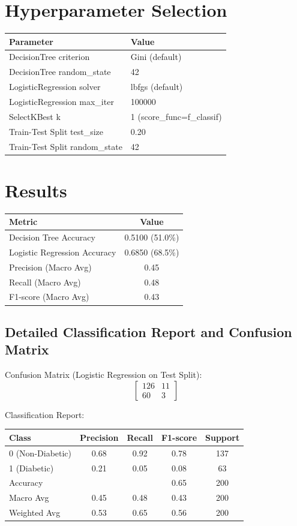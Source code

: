 \documentclass[12pt,a4paper]{article}
\begin{document}
\section{Hyperparameter Selection}

\begin{tabular}{ll}
\toprule
Parameter & Value\\
\midrule
DecisionTree criterion & Gini (default) \\
DecisionTree random\_state & 42 \\
LogisticRegression solver & lbfgs (default) \\
LogisticRegression max\_iter & 100000 \\
SelectKBest k & 1 (score\_func=f\_classif) \\
Train-Test Split test\_size & 0.20 \\
Train-Test Split random\_state & 42 \\
\bottomrule
\end{tabular}

\section{Results}

\begin{tabular}{lc}
\toprule
Metric & Value\\
\midrule
Decision Tree Accuracy & 0.5100 (51.0\%) \\
Logistic Regression Accuracy & 0.6850 (68.5\%) \\
Precision (Macro Avg) & 0.45 \\
Recall (Macro Avg) & 0.48 \\
F1-score (Macro Avg) & 0.43 \\
\bottomrule
\end{tabular}

\subsection*{Detailed Classification Report and Confusion Matrix}

Confusion Matrix (Logistic Regression on Test Split):
\begin{equation*}
\begin{bmatrix}
126 & 11 \\
60 & 3
\end{bmatrix}
\end{equation*}

Classification Report:
\begin{tabular}{lcccc}
\toprule
Class & Precision & Recall & F1-score & Support \\
\midrule
0 (Non-Diabetic) & 0.68 & 0.92 & 0.78 & 137 \\
1 (Diabetic) & 0.21 & 0.05 & 0.08 & 63 \\
\midrule
Accuracy & & & 0.65 & 200 \\
Macro Avg & 0.45 & 0.48 & 0.43 & 200 \\
Weighted Avg & 0.53 & 0.65 & 0.56 & 200 \\
\bottomrule
\end{tabular}
\end{document}
